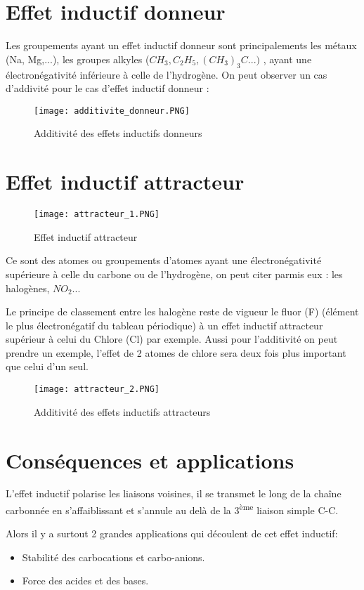 \documentclass[a4paper, oneside]{book}
\begin{document}
\section{Effet inductif donneur}
Les groupements ayant un effet inductif donneur sont principalements les métaux (Na, Mg,...), les groupes alkyles ($CH_3, C_2H_5,(CH_3)_3C...)$ , ayant une électronégativité inférieure à celle de l'hydrogène. On peut observer un cas d'addivité pour le cas d'effet inductif donneur : 
\begin{figure}[!h]
    \centering
    \texttt{[image: additivite\_donneur.PNG]}
    \caption{Additivité des effets inductifs donneurs}
    \label{fig:my_label}
\end{figure}
\section{Effet inductif attracteur}
\begin{figure}[!h]
    \centering
    \texttt{[image: attracteur\_1.PNG]}
    \caption{Effet inductif attracteur}
    \label{fig:my_label}
\end{figure}
Ce sont des atomes ou groupements d'atomes ayant une électronégativité supérieure à celle du carbone ou de l'hydrogène, on peut citer parmis eux : les halogènes, $NO_2$...

Le principe de classement entre les halogène reste de vigueur le fluor (F) (élément le plus électronégatif du tableau périodique) à un effet inductif attracteur supérieur à celui du Chlore (Cl) par exemple. Aussi pour l'additivité on peut prendre un exemple, l’effet de 2 atomes de chlore sera deux fois plus important que celui d’un seul.
\begin{figure}[!h]
    \centering
    \texttt{[image: attracteur\_2.PNG]}
    \caption{Additivité des effets inductifs attracteurs}
    \label{fig:my_label}
\end{figure}
\section{Conséquences et applications}
L'effet inductif polarise les liaisons voisines, il se transmet le long de la chaîne carbonnée en s'affaiblissant et s'annule au delà de la 3\textsuperscript{ème} liaison simple C-C.

Alors il y a surtout 2 grandes applications qui découlent de cet effet inductif: 
\begin{itemize}
    \item Stabilité des carbocations et carbo-anions.
    \item Force des acides et des bases.
\end{itemize}
\end{document}
